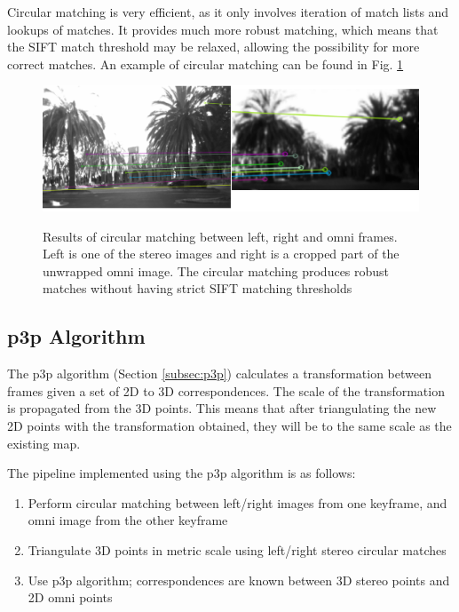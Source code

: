 Circular matching is very efficient, as it only involves iteration of match lists and lookups of matches.  It provides much more robust matching, which means that the SIFT match threshold may be relaxed, allowing the possibility for more correct matches. An example of circular matching can be found in Fig. \ref{fig:circular_match} 

\begin{figure}[h]
  \centering
    \includegraphics[width=1.0\textwidth]{chapters/images/circular_match}\\
  \caption{Results of circular matching between left, right and omni frames. Left is one of the stereo images and right is a cropped part of the unwrapped omni image. The circular matching produces robust matches without having strict SIFT matching thresholds}
  \label{fig:circular_match}
\end{figure}

\subsection{p3p Algorithm}


The p3p algorithm (Section \ref{subsec:p3p}) calculates a transformation between frames given a set of 2D to 3D correspondences.  The scale of the transformation is propagated from the 3D points.  This means that after triangulating the new 2D points with the transformation obtained, they will be to the same scale as the existing map.

The pipeline implemented using the p3p algorithm is as follows:

\begin{enumerate}
\itemsep0em
 \item Perform circular matching between left/right images from one keyframe, and omni image from the other keyframe
 \item Triangulate 3D points in metric scale using left/right stereo circular matches
 \item Use p3p algorithm; correspondences are known between 3D stereo points and 2D omni points
\end{enumerate}

